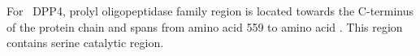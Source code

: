 For~ DPP4, prolyl oligopeptidase family region is located towards the C-terminus of the protein chain and spans from amino acid 559 to amino acid . This region contains serine catalytic region.  